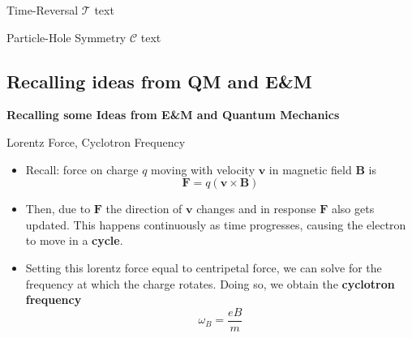 \documentclass[12pt, aspectratio=169]{beamer}
\begin{document}
\begin{frame}{Time-Reversal $\mathcal{T}$}
    text
\end{frame}

\begin{frame}{Particle-Hole Symmetry $\mathcal{C}$}
    text
\end{frame}


\subsection{Recalling ideas from QM and E\&M}

\begin{frame}{}
    \begin{center}
        \textbf{Recalling some Ideas from E\&M and Quantum Mechanics} 
    \end{center}
\end{frame}

\begin{frame}{Lorentz Force, Cyclotron Frequency}
    \begin{itemize}
        \item <1->{Recall: force on charge $q$ moving with velocity $\mathbf{v}$ in magnetic field $\mathbf{B}$ is $$\mathbf{F} = q(\mathbf{v} \times \mathbf{B})$$}
        \item <2->{Then, due to $\mathbf{F}$ the direction of $\mathbf{v}$ changes and in response $\mathbf{F}$ also gets updated. This happens continuously as time progresses, causing the electron to move in a \textbf{cycle}.}
        \item <3->{Setting this lorentz force equal to centripetal force, we can solve for the frequency at which the charge rotates. Doing so, we obtain the \textbf{cyclotron frequency} $$\omega_{B} = \frac{eB}{m}$$}
    \end{itemize}
    \cite{MoessnerMoore21}
\end{frame}
\end{document}
